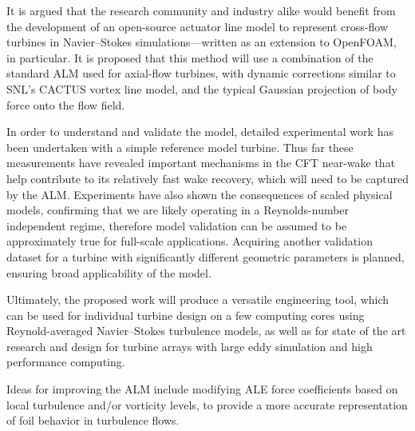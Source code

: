 It is argued that the research community and industry alike would benefit from
the development of an open-source actuator line model to represent cross-flow
turbines in Navier--Stokes simulations---written as an extension to OpenFOAM, in
particular. It is proposed that this method will use a combination of the
standard ALM used for axial-flow turbines, with dynamic corrections similar to
SNL's CACTUS vortex line model, and the typical Gaussian projection of body
force onto the flow field.

In order to understand and validate the model, detailed experimental work has
been undertaken with a simple reference model turbine. Thus far these
measurements have revealed important mechanisms in the CFT near-wake that help
contribute to its relatively fast wake recovery, which will need to be captured
by the ALM. Experiments have also shown the consequences of scaled physical
models, confirming that we are likely operating in a Reynolds-number independent
regime, therefore model validation can be assumed to be approximately true for
full-scale applications. Acquiring another validation dataset for a turbine
with significantly different geometric parameters is planned, ensuring broad
applicability of the model.

Ultimately, the proposed work will produce a versatile engineering tool, which
can be used for individual turbine design on a few computing cores using
Reynold-averaged Navier--Stokes turbulence models, as well as for state of the
art research and design for turbine arrays with large eddy simulation and high
performance computing.

Ideas for improving the ALM include modifying ALE force coefficients based on
local turbulence and/or vorticity levels, to provide a more accurate
representation of foil behavior in turbulence flows.